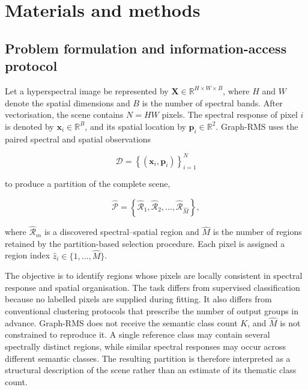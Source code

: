 \documentclass[10pt,a4paper,fleqn]{article}
\begin{document}
\section{Materials and methods}
\label{sec:materials_methods}

\subsection{Problem formulation and information-access protocol}
\label{subsec:problem_formulation}

Let a hyperspectral image be represented by
\(\mathbf{X}\in\mathbb{R}^{H\times W\times B}\), where \(H\) and \(W\)
denote the spatial dimensions and \(B\) is the number of spectral bands. After
vectorisation, the scene contains \(N=HW\) pixels. The spectral response of
pixel \(i\) is denoted by \(\mathbf{x}_i\in\mathbb{R}^{B}\), and its spatial
location by \(\mathbf{p}_i\in\mathbb{R}^{2}\). Graph-RMS uses the paired
spectral and spatial observations

\begin{equation}
\mathcal{D}
=
\left\{
\left(\mathbf{x}_i,\mathbf{p}_i\right)
\right\}_{i=1}^{N}
\end{equation}

to produce a partition of the complete scene,

\begin{equation}
\widehat{\mathcal{P}}
=
\left\{
\widehat{\mathcal{R}}_{1},
\widehat{\mathcal{R}}_{2},
\ldots,
\widehat{\mathcal{R}}_{\widehat{M}}
\right\},
\end{equation}

where \(\widehat{\mathcal{R}}_{m}\) is a discovered spectral--spatial region
and \(\widehat{M}\) is the number of regions retained by the partition-based
selection procedure. Each pixel is assigned a region index
\(\widehat{z}_{i}\in\{1,\ldots,\widehat{M}\}\).

The objective is to identify regions whose pixels are locally consistent in
spectral response and spatial organisation. The task differs from supervised
classification because no labelled pixels are supplied during fitting. It also
differs from conventional clustering protocols that prescribe the number of
output groups in advance. Graph-RMS does not receive the semantic class count
\(K\), and \(\widehat{M}\) is not constrained to reproduce it. A single
reference class may contain several spectrally distinct regions, while similar
spectral responses may occur across different semantic classes. The resulting
partition is therefore interpreted as a structural description of the scene
rather than an estimate of its thematic class count.
\end{document}
